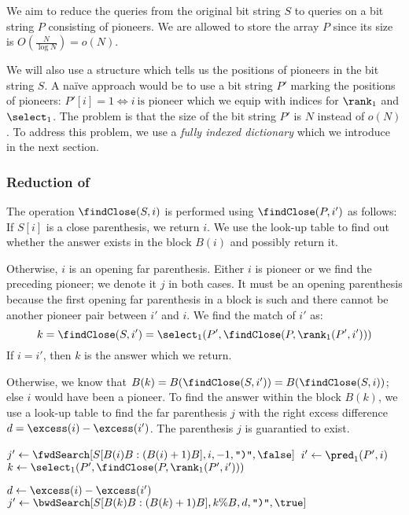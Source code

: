 \bigbreak

We aim to reduce the queries from the original bit string $S$ to queries on a bit string $P$ consisting of pioneers.
We are allowed to store the array $P$ since its size is $O(\frac{N}{\log N}) = o(N)$.

We will also use a structure which tells us the positions of pioneers in the bit string $S$.
A naïve approach would be to use a bit string $P'$ marking the positions of pioneers: $P'[i] = 1 \iff i\ \textrm{is pioneer}$ which we equip with indices for $\rank_1$ and $\select_1$.
The problem is that the size of the bit string $P'$ is $N$ instead of $o(N)$.
To address this problem, we use a \emph{fully indexed dictionary} which we introduce in the next section.

\subsubsection{Reduction of \findClose}

The operation $\findClose(S, i)$ is performed using $\findClose(P, i')$ as follows:
If $S[i]$ is a close parenthesis, we return $i$.
We use the look-up table to find out whether the answer exists in the block $B(i)$ and possibly return it.

Otherwise, $i$ is an opening far parenthesis.
Either $i$ is pioneer or we find the preceding pioneer; we denote it $j$ in both cases.
It must be an opening parenthesis because the first opening far parenthesis in a block is such and there cannot be another pioneer pair between $i'$ and $i$.
We find the match of $i'$ as:
$$ k = \findClose(S, i') = \select_1(P', \findClose(P, \rank_1(P', i'))) $$
If $i = i'$, then $k$ is the answer which we return.

Otherwise, we know that $B(k) = B(\findClose(S, i')) = B(\findClose(S, i))$; else $i$ would have been a pioneer.
To find the answer within the block $B(k)$, we use a look-up table \bwdSearch{} to find the far parenthesis $j$ with the right excess difference $d = \excess(i) - \excess(i')$.
The parenthesis $j$ is guarantied to exist.

\begin{algorithmic}
		\State {}
	\Else
		\State $j' \gets \fwdSearch[S[B(i)B: (B(i) + 1)B], i, -1, \closingParen, \false]$
			\State {} 
		\Else
			\State $i' \gets \pred_1(P', i)$
			\State $k \gets \select_1(P', \findClose(P, \rank_1(P', i')))$ 

			\State $d \gets \excess(i) - \excess(i')$
			\State $j' \gets \bwdSearch[S[B(k)B: (B(k) + 1)B], k \% B, d, \closingParen, \true]$
			\State {}
		\EndIf
	\EndIf
\EndFunction
\end{algorithmic}

